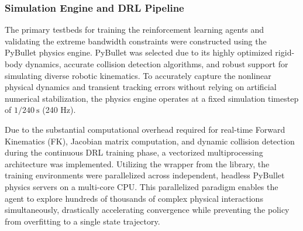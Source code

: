 \subsubsection{Simulation Engine and DRL Pipeline}
The primary testbeds for training the reinforcement learning agents and validating the extreme bandwidth constraints were constructed using the PyBullet physics engine. 
PyBullet was selected due to its highly optimized rigid-body dynamics, accurate collision detection algorithms, and robust support for simulating diverse robotic kinematics. 
To accurately capture the nonlinear physical dynamics and transient tracking errors without relying on artificial numerical stabilization, the physics engine operates at a fixed simulation timestep of $1/240~\text{s}$ (240 Hz).

Due to the substantial computational overhead required for real-time Forward Kinematics (FK), Jacobian matrix computation, and dynamic collision detection during the continuous DRL training phase, a vectorized multiprocessing architecture was implemented.
Utilizing the  wrapper from the  library, the training environments were parallelized 
across independent, headless PyBullet physics servers on a multi-core CPU. This parallelized paradigm enables the agent to explore 
hundreds of thousands of complex physical interactions simultaneously, drastically accelerating convergence while preventing the policy from overfitting 
to a single state trajectory.

